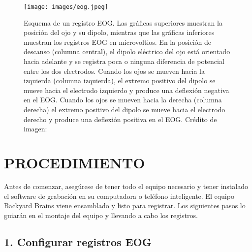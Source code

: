\documentclass[12pt]{article}
\begin{document}
\begin{figure}[h!]
\centering
\texttt{[image: images/eog.jpeg]}
\caption{Esquema de un registro EOG. Las gráficas superiores muestran
  la posición del ojo y su dipolo, mientras que las gráficas
  inferiores muestran los registros EOG en microvoltios. En la
  posición de descanso (columna central), el dipolo eléctrico del ojo
  está orientado hacia adelante y se registra poca o ninguna
  diferencia de potencial entre los dos electrodos. Cuando los ojos se
  mueven hacia la izquierda (columna izquierda), el extremo positivo
  del dipolo se mueve hacia el electrodo izquierdo y produce una
  deflexión negativa en el EOG. Cuando los ojos se mueven hacia la
  derecha (columna derecha) el extremo positivo del dipolo se mueve
  hacia el electrodo derecho y produce una deflexión positiva en el
  EOG. Crédito de imagen: \cite{viqueira2013ocular}}
\label{fig:eog}
\end{figure}

\section*{PROCEDIMIENTO}
Antes de comenzar, asegúrese de tener todo el equipo necesario y tener
instalado el software de grabación en su computadora o teléfono
inteligente. El equipo Backyard Brains viene ensamblado y listo para
registrar. Los siguientes pasos lo guiarán en el montaje del equipo y
llevando a cabo los registros.

\subsection*{1. Configurar registros EOG}
\end{document}
